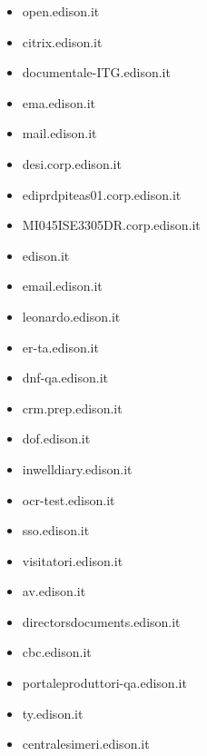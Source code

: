 \documentclass{article}
\begin{document}
\begin{itemize}
            \item open.edison.it
        
            \item citrix.edison.it
        
            \item documentale-ITG.edison.it
        
            \item ema.edison.it
        
            \item mail.edison.it
        
            \item desi.corp.edison.it
        
            \item ediprdpiteas01.corp.edison.it
        
            \item MI045ISE3305DR.corp.edison.it
        
            \item edison.it
        
            \item email.edison.it
        
            \item leonardo.edison.it
        
            \item er-ta.edison.it
        
            \item dnf-qa.edison.it
        
            \item crm.prep.edison.it
        
            \item dof.edison.it
        
            \item inwelldiary.edison.it
        
            \item ocr-test.edison.it
        
            \item sso.edison.it
        
            \item visitatori.edison.it
        
            \item av.edison.it
        
            \item directorsdocuments.edison.it
        
            \item cbc.edison.it
        
            \item portaleproduttori-qa.edison.it
        
            \item ty.edison.it
        
            \item centralesimeri.edison.it
        
    
\end{itemize}
\end{document}
